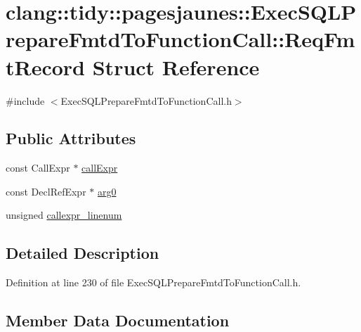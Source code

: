 \hypertarget{structclang_1_1tidy_1_1pagesjaunes_1_1_exec_s_q_l_prepare_fmtd_to_function_call_1_1_req_fmt_record}{}\section{clang\+:\+:tidy\+:\+:pagesjaunes\+:\+:Exec\+S\+Q\+L\+Prepare\+Fmtd\+To\+Function\+Call\+:\+:Req\+Fmt\+Record Struct Reference}
\label{structclang_1_1tidy_1_1pagesjaunes_1_1_exec_s_q_l_prepare_fmtd_to_function_call_1_1_req_fmt_record}


{\ttfamily \#include $<$Exec\+S\+Q\+L\+Prepare\+Fmtd\+To\+Function\+Call.\+h$>$}

\subsection*{Public Attributes}
\begin{DoxyCompactItemize}
\item 
const Call\+Expr $\ast$ \hyperlink{structclang_1_1tidy_1_1pagesjaunes_1_1_exec_s_q_l_prepare_fmtd_to_function_call_1_1_req_fmt_record_aa3bfc353a1592d7f852c20457b61b647}{call\+Expr}
\item 
const Decl\+Ref\+Expr $\ast$ \hyperlink{structclang_1_1tidy_1_1pagesjaunes_1_1_exec_s_q_l_prepare_fmtd_to_function_call_1_1_req_fmt_record_ae2c95e1eb0659934922a3c6ab095bc6a}{arg0}
\item 
unsigned \hyperlink{structclang_1_1tidy_1_1pagesjaunes_1_1_exec_s_q_l_prepare_fmtd_to_function_call_1_1_req_fmt_record_a67fdb98e1639a7a708d7ec87a5540ee6}{callexpr\+\_\+linenum}
\end{DoxyCompactItemize}


\subsection{Detailed Description}


Definition at line 230 of file Exec\+S\+Q\+L\+Prepare\+Fmtd\+To\+Function\+Call.\+h.



\subsection{Member Data Documentation}
\mbox{\label{structclang_1_1tidy_1_1pagesjaunes_1_1_exec_s_q_l_prepare_fmtd_to_function_call_1_1_req_fmt_record_ae2c95e1eb0659934922a3c6ab095bc6a}} 
